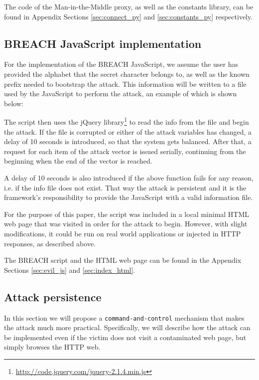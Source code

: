 The code of the Man-in-the-Middle proxy, as well as the constants library, can
be found in Appendix Sections \ref{sec:connect_py} and \ref{sec:constants_py}
respectively.

\subsection{BREACH JavaScript implementation}

For the implementation of the BREACH JavaScript, we assume the user has provided
the alphabet that the secret character belongs to, as well as the known prefix
needed to bootstrap the attack. This information will be written to a file used
by the JavaScript to perform the attack, an example of which is shown below:


The script then uses the jQuery
library\footnote{\url{http://code.jquery.com/jquery-2.1.4.min.js}} to read the
info from the file and begin the attack. If the file is corrupted or either of
the attack variables has changed, a delay of 10 seconds is introduced, so that
the system gets balanced. After that, a request for each item of the attack
vector is issued serially, continuing from the beginning when the end of the
vector is reached.

A delay of 10 seconds is also introduced if the above function fails for any
reason, i.e. if the info file does not exist. That way the attack is persistent
and it is the framework's responsibility to provide the JavaScript with a valid
information file.

For the purpose of this paper, the script was included in a local minimal HTML
web page that was visited in order for the attack to begin. However, with slight
modifications, it could be run on real world applications or injected in HTTP
responses, as described above.

The BREACH script and the HTML web page can be found in the Appendix Sections
\ref{sec:evil_js} and \ref{sec:index_html}.

\subsection{Attack persistence}\label{sec:persistence}

In this section we will propose a \texttt{command-and-control} mechanism that
makes the attack much more practical. Specifically, we will describe how the
attack can be implemented even if the victim does not visit a contaminated web
page, but simply browses the HTTP web.

